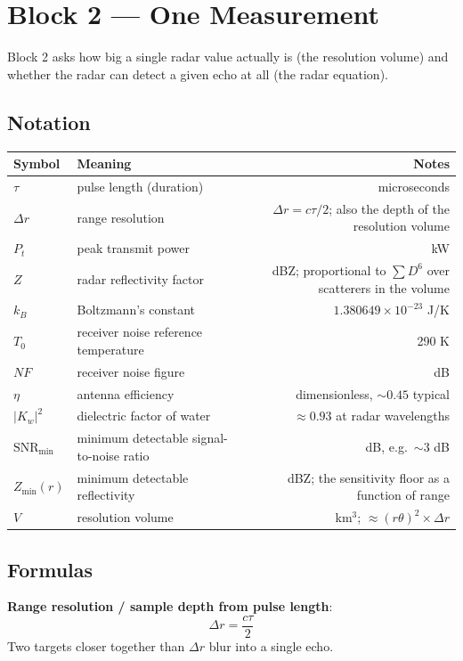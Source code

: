 \documentclass[11pt]{article}
\begin{document}
\section{Block 2 --- One Measurement}

Block 2 asks how big a single radar value actually is (the resolution volume) and whether the radar can detect a given echo at all (the radar equation).

\subsection{Notation}
\begin{longtable}{L M N}
\toprule
Symbol & Meaning & Notes \\
\midrule
\endhead
$\tau$ & pulse length (duration) & microseconds \\
$\Delta r$ & range resolution & $\Delta r = c\tau/2$; also the depth of the resolution volume \\
$P_t$ & peak transmit power & kW \\
$Z$ & radar reflectivity factor & dBZ; proportional to $\sum D^6$ over scatterers in the volume \\
$k_B$ & Boltzmann's constant & $1.380649\times10^{-23}$ J/K \\
$T_0$ & receiver noise reference temperature & 290 K \\
$NF$ & receiver noise figure & dB \\
$\eta$ & antenna efficiency & dimensionless, $\sim0.45$ typical \\
$|K_w|^2$ & dielectric factor of water & $\approx 0.93$ at radar wavelengths \\
$\mathrm{SNR}_{\min}$ & minimum detectable signal-to-noise ratio & dB, e.g.\ $\sim3$ dB \\
$Z_{\min}(r)$ & minimum detectable reflectivity & dBZ; the sensitivity floor as a function of range \\
$V$ & resolution volume & km$^3$; $\approx (r\theta)^2 \times \Delta r$ \\
\bottomrule
\end{longtable}

\subsection{Formulas}

\textbf{Range resolution / sample depth from pulse length}:
\begin{equation}
\Delta r = \frac{c\tau}{2}
\end{equation}
Two targets closer together than $\Delta r$ blur into a single echo.
\end{document}
